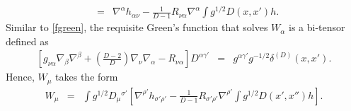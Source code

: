 \documentclass[10pt,letterpaper]{article}
\numberwithin{equation}{section}
\begin{document}
\begin{appendices}
\begin{eqnarray}
&=& \nabla^\alpha h_{\alpha\nu} - \frac{1}{D-1}R_{\nu\alpha}\nabla^\alpha \int g^{1/2} D(x,x') h.
\label{treq4}
\end{eqnarray}
Similar to \eqref{fgreen}, the requisite Green's function that solves $W_\alpha$ is a bi-tensor defined as
\begin{eqnarray}
\left[g_{\nu\alpha}\nabla_\beta\nabla^\beta + \left(\frac{D-2}{D}\right)\nabla_\nu \nabla_\alpha - R_{\nu\alpha}\right]D^{\alpha\gamma'} &=& g^{\alpha\gamma'} g^{-1/2} \delta^{(D)}(x,x').
\end{eqnarray}
Hence, $W_\mu$ takes the form
\begin{eqnarray}
W_{\mu} &=& \int g^{1/2} D_\mu{}^{\sigma'} \left[ \nabla^{\rho'} h_{\sigma'\rho'}-
\frac{1}{D-1}R_{\sigma'\rho'}\nabla^{\rho'} \int g^{1/2} D(x',x'') h\right].
\end{eqnarray}
%
%

\end{appendices}
\end{document}
